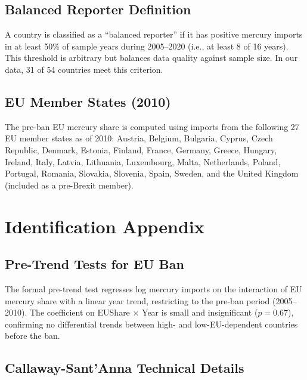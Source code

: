 \documentclass[12pt]{article}
\begin{document}
\subsection{Balanced Reporter Definition}

A country is classified as a ``balanced reporter'' if it has positive mercury imports in at least 50\% of sample years during 2005--2020 (i.e., at least 8 of 16 years). This threshold is arbitrary but balances data quality against sample size. In our data, 31 of 54 countries meet this criterion.

\subsection{EU Member States (2010)}

The pre-ban EU mercury share is computed using imports from the following 27 EU member states as of 2010: Austria, Belgium, Bulgaria, Cyprus, Czech Republic, Denmark, Estonia, Finland, France, Germany, Greece, Hungary, Ireland, Italy, Latvia, Lithuania, Luxembourg, Malta, Netherlands, Poland, Portugal, Romania, Slovakia, Slovenia, Spain, Sweden, and the United Kingdom (included as a pre-Brexit member).


\section{Identification Appendix}

\subsection{Pre-Trend Tests for EU Ban}

The formal pre-trend test regresses log mercury imports on the interaction of EU mercury share with a linear year trend, restricting to the pre-ban period (2005--2010). The coefficient on EUShare $\times$ Year is small and insignificant ($p = 0.67$), confirming no differential trends between high- and low-EU-dependent countries before the ban.

\subsection{Callaway-Sant'Anna Technical Details}
\end{document}
